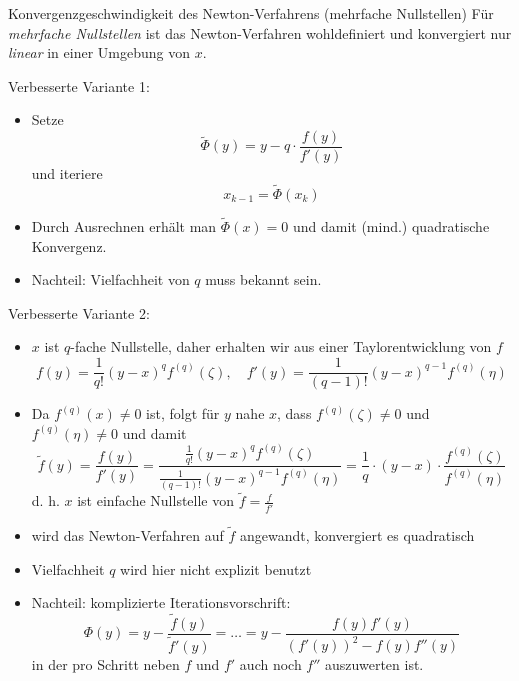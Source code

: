 \begin{defi}{Konvergenzgeschwindigkeit des Newton-Verfahrens (mehrfache Nullstellen)}
    Für \emph{mehrfache Nullstellen} ist das Newton-Verfahren wohldefiniert und konvergiert nur \emph{linear} in einer Umgebung von $x$.
    
    Verbesserte Variante 1: 
    \begin{itemize}
        \item Setze
              \[ 
                  \tilde{\Phi}(y) = y - q \cdot \frac{f(y)}{f'(y)}
              \]
              und iteriere 
              \[
                  x_{k-1} = \tilde{\Phi}(x_k)
              \]
        \item Durch Ausrechnen erhält man $\tilde{\Phi}(x) = 0$ und damit (mind.) quadratische Konvergenz.
        \item Nachteil: Vielfachheit von $q$ muss bekannt sein.
    \end{itemize}
    
    Verbesserte Variante 2:
    \begin{itemize}
        \item $x$ ist $q$-fache Nullstelle, daher erhalten wir aus einer Taylorentwicklung von $f$
              \[ 
                  f(y) = \frac{1}{q!} (y - x)^q f^{(q)} (\zeta), \quad f'(y) = \frac{1}{(q-1)!} (y - x)^{q-1} f^{(q)} (\eta)
              \]
        \item Da $f^{(q)} (x) \neq 0$ ist, folgt für $y$ nahe $x$, dass $f^{(q)} (\zeta) \neq 0$ und $f^{(q)} (\eta) \neq 0$ und damit
              \[ 
                  \tilde{f} (y) = \frac{f(y)}{f'(y)} = \frac{\frac{1}{q!} (y - x)^q f^{(q)} (\zeta)}{\frac{1}{(q-1)!} (y - x)^{q-1} f^{(q)} (\eta)} = \frac{1}{q} \cdot (y - x) \cdot \frac{f^{(q)} (\zeta)}{f^{(q)} (\eta)}
              \]
              d. h. $x$ ist einfache Nullstelle von $\tilde{f} = \frac{f}{f'}$
        \item wird das Newton-Verfahren auf $\tilde{f}$ angewandt, konvergiert es quadratisch
        \item Vielfachheit $q$ wird hier nicht explizit benutzt
        \item Nachteil: komplizierte Iterationsvorschrift:
              \[
                  \Phi(y) = y - \frac{\tilde{f}(y)}{\tilde{f}'(y)} = \ldots = y - \frac{f(y) f'(y)}{\left( f'(y) \right)^2 - f(y) f''(y)}
              \]
              in der pro Schritt neben $f$ und $f'$ auch noch $f''$ auszuwerten ist.
    \end{itemize}
\end{defi}

